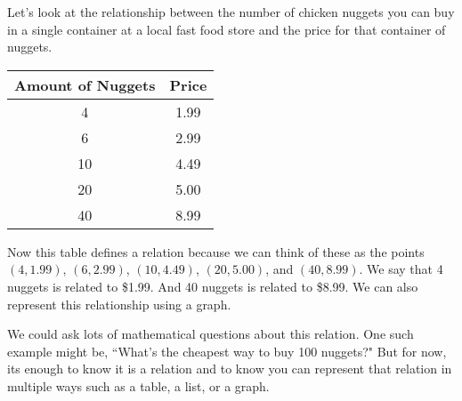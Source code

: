 \documentclass{ximera}
\begin{document}
\begin{example}
Let's look at the relationship between the number of chicken nuggets you can buy in a single container at a local fast food store and the price for that container of nuggets.
\begin{center}
 \begin{tabular}{||c c||} 
 \hline
 Amount of Nuggets & Price \\ [0.5ex] 
 \hline\hline
 4 & 1.99\\ 
 \hline
 6 & 2.99 \\
 \hline
 10 & 4.49\\
 \hline
 20 & 5.00 \\
 \hline
 40 & 8.99\\ [1ex] 
 \hline
\end{tabular}
\end{center}

Now this table defines a relation because we can think of these as the points $(4,1.99)$, $(6,2.99)$, $(10,4.49)$, $(20,5.00)$, and $(40, 8.99)$.  We say that 4 nuggets is related to \$1.99.  And 40 nuggets is related to \$8.99.  We can also represent this relationship using a graph.


We could ask lots of mathematical questions about this relation.  One such example might be, ``What's the cheapest way to buy 100 nuggets?"  But for now, its enough to know it is a relation and to know you can represent that relation in multiple ways such as a table, a list, or a graph.

\end{example}
\end{document}
